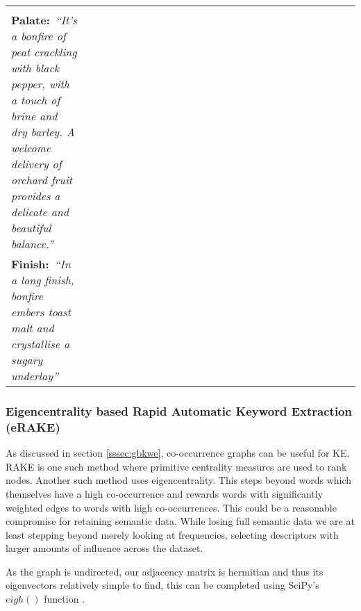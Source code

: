 \begin{table}
\begin{tabular}{p{0.2\linewidth} p{0.8\linewidth}}
\begin{minipage}[t]{0.8\columnwidth}
{            }\\
            \textbf{Palate:}\textit{~``It's a bonfire of peat crackling with black pepper, with a touch of brine 
            and dry barley. A welcome delivery of orchard fruit provides a delicate and beautiful balance.''
            }\\
            \textbf{Finish:}~\textit{``In a long finish, bonfire embers toast malt and crystallise a sugary underlay''
            }\end{minipage}                                                                                                                                                                                                                                                    \\
        \toprule
    \end{tabular}
\end{table}

\subsubsection{Eigencentrality based Rapid Automatic Keyword Extraction (eRAKE)}\label{ssec:erake}
As discussed in section \ref{sssec:gbkwe}, co-occurrence graphs can be useful for KE.  RAKE is one such method where primitive
centrality measures are used to rank nodes.  Another such method uses eigencentrality.  This steps beyond words which
themselves have a high co-occurrence and rewards words with significantly weighted edges to words with high co-occurrences.
This could be a reasonable compromise for retaining semantic data.  While losing full semantic data we are
at least stepping beyond merely looking at frequencies, selecting descriptors with larger amounts of influence across
the dataset.

As the graph is undirected, our adjacency matrix is hermitian and thus its eigenvectors relatively simple to find,
this can be completed using SciPy's $eigh()$ function \cite{hubbard_2020, 2020NumPy}.